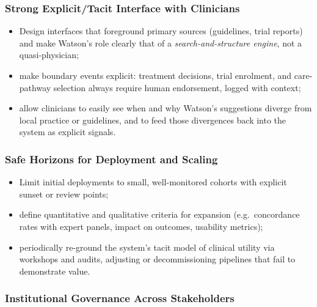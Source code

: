 \subsubsection*{Strong Explicit/Tacit Interface with Clinicians}

\begin{itemize}
  \item Design interfaces that foreground primary sources (guidelines,
        trial reports) and make Watson’s role clearly that of a
        \emph{search-and-structure engine}, not a quasi-physician;
  \item make boundary events explicit:
        treatment decisions, trial enrolment, and care-pathway selection
        always require human endorsement, logged with context;
  \item allow clinicians to easily see when and why Watson’s suggestions
        diverge from local practice or guidelines, and to feed those
        divergences back into the system as explicit signals.
\end{itemize}

\subsubsection*{Safe Horizons for Deployment and Scaling}

\begin{itemize}
  \item Limit initial deployments to small, well-monitored cohorts with
        explicit sunset or review points;
  \item define quantitative and qualitative criteria for expansion
        (e.g.\ concordance rates with expert panels, impact on outcomes,
        usability metrics);
  \item periodically re-ground the system’s tacit model of clinical utility
        via workshops and audits, adjusting or decommissioning pipelines that
        fail to demonstrate value.
\end{itemize}

\subsubsection*{Institutional Governance Across Stakeholders}

